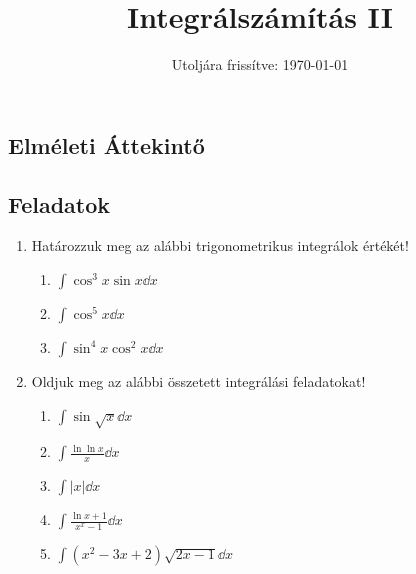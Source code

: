 \documentclass[a4paper, 12pt]{scrartcl}
\title{Integrálszámítás II}
\date{Utoljára frissítve: \today}
\begin{document}
\maketitle

\subsection{Elméleti Áttekintő}

\clearpage
\subsection{Feladatok}

\begin{enumerate}
  \item Határozzuk meg az alábbi trigonometrikus integrálok értékét!
        \begin{multicols}{3}
          \begin{enumerate}
            \item $\displaystyle
                    \int \cos^3 x \sin x \dd x
                  $

            \item $\displaystyle
                    \int \cos^5 x \dd x
                  $

            \item $\displaystyle
                    \int \sin^4 x \cos^2 x \dd x
                  $
          \end{enumerate}
        \end{multicols}

  \item Oldjuk meg az alábbi összetett integrálási feladatokat!
        \begin{enumerate}
          \item $\displaystyle
                  \int \sin \sqrt x \dd x
                $

          \item $\displaystyle
                  \int \frac{\ln \ln x}{x} \dd x
                $

          \item $\displaystyle
                  \int |x| \dd x
                $

          \item $\displaystyle
                  \int \frac{\ln x + 1}{x^x - 1} \dd x
                $

          \item $\displaystyle
                  \int (x^2 - 3x + 2) \sqrt{2x - 1} \dd x
                $
        \end{enumerate}


\end{enumerate}
\end{document}
